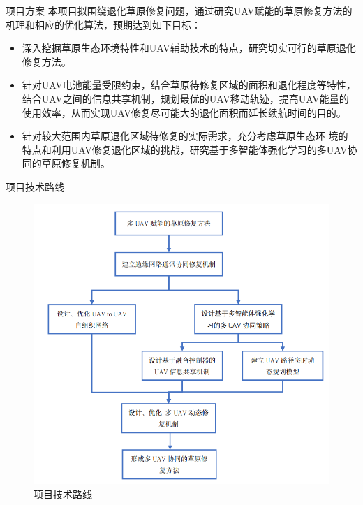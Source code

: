 \documentclass{beamer}
\begin{document}
\begin{frame}{项目方案}
    本项目拟围绕退化草原修复问题，通过研究UAV赋能的草原修复方法的机理和相应的优化算法，预期达到如下目标：
    
   \begin{itemize}
        
        \item 深入挖掘草原生态环境特性和UAV辅助技术的特点，研究切实可行的草原退化修复方法。
        \item 针对UAV电池能量受限约束，结合草原待修复区域的面积和退化程度等特性，结合UAV之间的信息共享机制，规划最优的UAV移动轨迹，提高UAV能量的使用效率，从而实现UAV修复尽可能大的退化面积而延长续航时间的目的。
        \item 针对较大范围内草原退化区域待修复的实际需求，充分考虑草原生态环 境的特点和利用UAV修复退化区域的挑战，研究基于多智能体强化学习的多UAV协同的草原修复机制。
    \end{itemize}
\end{frame}

\begin{frame}{项目技术路线}

    \begin{figure}[htbp]
		  \centering
            \includegraphics[scale=0.3]{pic/4.png}
            \caption{项目技术路线}
    \end{figure}
\end{frame}
\end{document}
